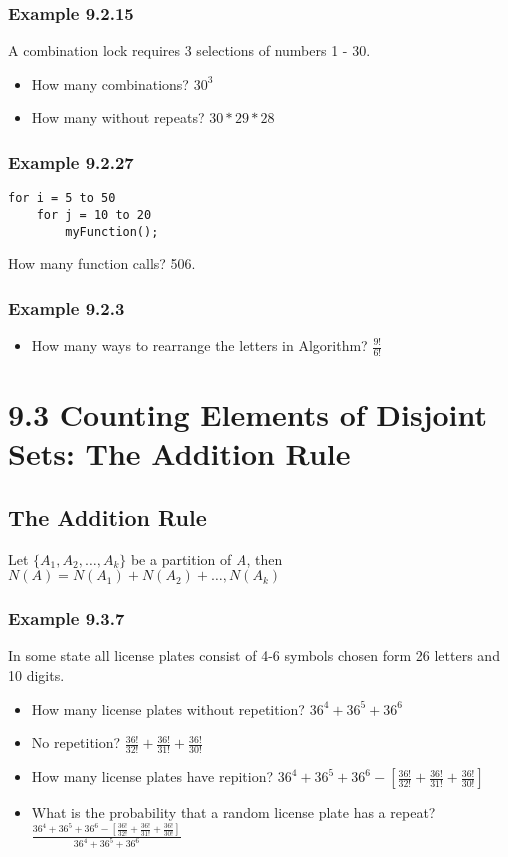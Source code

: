 \documentclass{article}
\begin{document}
\subsubsection*{Example 9.2.15}
A combination lock requires 3 selections of numbers 1 - 30.
\begin{itemize}
\item How many combinations? $30^3$
\item How many without repeats? $30 * 29 * 28$
\end{itemize}


\subsubsection*{Example 9.2.27}
\begin{verbatim}
for i = 5 to 50
    for j = 10 to 20
        myFunction();
\end{verbatim}

How many function calls? 506.

\subsubsection*{Example 9.2.3}
\begin{itemize}
\item How many ways to rearrange the letters in Algorithm? $\frac{9!}{6!}$
\end{itemize}

\section*{9.3 Counting Elements of Disjoint Sets: The Addition Rule}
\subsection{The Addition Rule}
Let $ \{ A_1, A_2, \ldots, A_k \}$ be a partition of \textit{A}, then $N(A) = N(A_1) + N(A_2) + \ldots, N(A_k)$

\subsubsection{Example 9.3.7}
In some state all license plates consist of 4-6 symbols chosen form 26 letters and 10 digits.

\begin{itemize}
\item How many license plates without repetition? $36^4 + 36^5 + 36^6$
\item No repetition? $\frac{36!}{32!} + \frac{36!}{31!} + \frac{36!}{30!}$
\item How many license plates have repition? $36^4 + 36^5 + 36^6 - [\frac{36!}{32!} + \frac{36!}{31!} + \frac{36!}{30!}]$
\item What is the probability that a random license plate has a repeat? $ \frac{36^4 + 36^5 + 36^6 - [\frac{36!}{32!} + \frac{36!}{31!} + \frac{36!}{30!}]}{36^4 + 36^5 + 36^6} $
\end{itemize}
\end{document}
